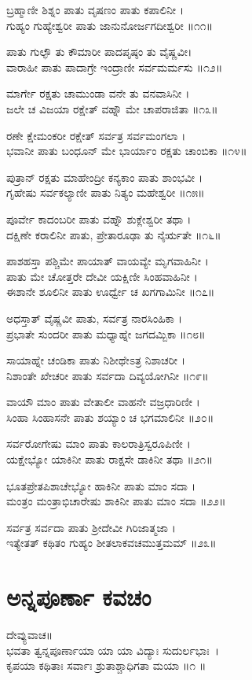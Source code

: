 ಬ್ರಹ್ಮಾಣೀ ಶಿಶ್ನಂ ಪಾತು ವೃಷಣಂ ಪಾತು ಕಪಾಲಿನೀ ।\\
ಗುಹ್ಯಂ ಗುಹ್ಯೇಶ್ವರೀ ಪಾತು ಜಾನುನೋರ್ಜಗದೀಶ್ವರೀ ॥೧೧॥

ಪಾತು ಗುಲ್ಫೌ ತು ಕೌಮಾರೀ ಪಾದಪೃಷ್ಠಂ ತು ವೈಷ್ಣವೀ।\\
ವಾರಾಹೀ ಪಾತು ಪಾದಾಗ್ರೇ ಇಂದ್ರಾಣೀ ಸರ್ವಮರ್ಮಸು ॥೧೨॥

ಮಾರ್ಗೇ ರಕ್ಷತು ಚಾಮುಂಡಾ ವನೇ ತು ವನವಾಸಿನೀ ।\\
ಜಲೇ ಚ ವಿಜಯಾ ರಕ್ಷೇತ್ ವಹ್ನೌ ಮೇ ಚಾಪರಾಜಿತಾ ॥೧೩॥

ರಣೇ ಕ್ಷೇಮಂಕರೀ ರಕ್ಷೇತ್ ಸರ್ವತ್ರ ಸರ್ವಮಂಗಲಾ ।\\
ಭವಾನೀ ಪಾತು ಬಂಧೂನ್ ಮೇ ಭಾರ್ಯಾಂ ರಕ್ಷತು ಚಾಂಬಿಕಾ ॥೧೪॥

ಪುತ್ರಾನ್ ರಕ್ಷತು ಮಾಹೇಂದ್ರೀ ಕನ್ಯಕಾಂ ಪಾತು ಶಾಂಭವೀ ।\\
ಗೃಹೇಷು ಸರ್ವಕಲ್ಯಾಣೀ ಪಾತು ನಿತ್ಯಂ ಮಹೇಶ್ವರೀ ॥೧೫॥

ಪೂರ್ವೇ ಕಾದಂಬರೀ ಪಾತು ವಹ್ನೌ ಶುಕ್ಲೇಶ್ವರೀ ತಥಾ ।\\
ದಕ್ಷಿಣೇ ಕರಾಲಿನೀ ಪಾತು, ಪ್ರೇತಾರೂಢಾ ತು ನೈರ್ಋತೇ ॥೧೬॥

ಪಾಶಹಸ್ತಾ ಪಶ್ಚಿಮೇ ಪಾಯಾತ್ ವಾಯವ್ಯೇ ಮೃಗವಾಹಿನೀ ।\\
ಪಾತು ಮೇ ಚೋತ್ತರೇ ದೇವೀ ಯಕ್ಷಿಣೀ ಸಿಂಹವಾಹಿನೀ ।\\
ಈಶಾನೇ ಶೂಲಿನೀ ಪಾತು ಊರ್ಧ್ವೇ ಚ ಖಗಗಾಮಿನೀ ॥೧೭॥

ಅಧಸ್ತಾತ್ ವೈಷ್ಣವೀ ಪಾತು, ಸರ್ವತ್ರ ನಾರಸಿಂಹಿಕಾ ।\\
ಪ್ರಭಾತೇ ಸುಂದರೀ ಪಾತು ಮಧ್ಯಾಹ್ನೇ ಜಗದಮ್ಬಿಕಾ ॥೧೮॥

ಸಾಯಾಹ್ನೇ ಚಂಡಿಕಾ ಪಾತು ನಿಶೀಥೇಽತ್ರ ನಿಶಾಚರೀ ।\\
ನಿಶಾಂತೇ ಖೇಚರೀ ಪಾತು ಸರ್ವದಾ ದಿವ್ಯಯೋಗಿನೀ ॥೧೯॥

ವಾಯೌ ಮಾಂ ಪಾತು ವೇತಾಲೀ ವಾಹನೇ ವಜ್ರಧಾರಿಣೀ ।\\
ಸಿಂಹಾ ಸಿಂಹಾಸನೇ ಪಾತು ಶಯ್ಯಾಂ ಚ ಭಗಮಾಲಿನೀ ॥೨೦॥

ಸರ್ವರೋಗೇಷು ಮಾಂ ಪಾತು ಕಾಲರಾತ್ರಿಸ್ವರೂಪಿಣೀ ।\\
ಯಕ್ಷೇಭ್ಯೋ ಯಾಕಿನೀ ಪಾತು ರಾಕ್ಷಸೇ ಡಾಕಿನೀ ತಥಾ ॥೨೧॥

ಭೂತಪ್ರೇತಪಿಶಾಚೇಭ್ಯೋ ಹಾಕಿನೀ ಪಾತು ಮಾಂ ಸದಾ ।\\
ಮಂತ್ರಂ ಮಂತ್ರಾಭಿಚಾರೇಷು ಶಾಕಿನೀ ಪಾತು ಮಾಂ ಸದಾ ॥೨೨॥

ಸರ್ವತ್ರ ಸರ್ವದಾ ಪಾತು ಶ್ರೀದೇವೀ ಗಿರಿಜಾತ್ಮಜಾ ।\\
ಇತ್ಯೇತತ್ ಕಥಿತಂ ಗುಹ್ಯಂ ಶೀತಲಾಕವಚಮುತ್ತಮಮ್ ॥೨೩॥
\section{ಅನ್ನಪೂರ್ಣಾ ಕವಚಂ}
ದೇವ್ಯುವಾಚ॥\\
ಭವತಾ ತ್ವನ್ನಪೂರ್ಣಾಯಾ ಯಾ ಯಾ ವಿದ್ಯಾಃ ಸುದುರ್ಲಭಾಃ~।\\
ಕೃಪಯಾ ಕಥಿತಾಃ ಸರ್ವಾಃ ಶ್ರುತಾಶ್ಚಾಧಿಗತಾ ಮಯಾ ॥೧ ॥

